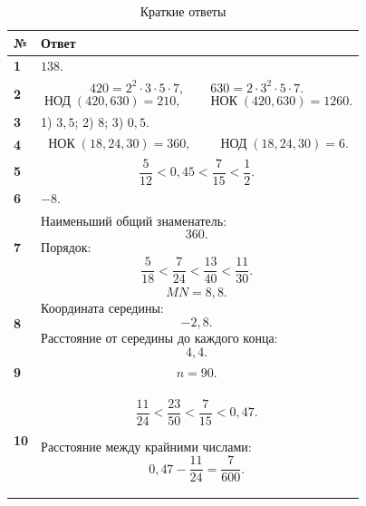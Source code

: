 \documentclass[a4paper,12pt]{article}
\newcommand{\nodmath}{
  \mathop{\mbox{НОД}}\nolimits
}
\newcommand{\nokmath}{
  \mathop{\mbox{НОК}}\nolimits
}
\begin{document}
\begin{table}[ht]
\centering
\caption{Краткие ответы}

\begin{tabularx}{\linewidth}{@{}>{\bfseries}p{12mm}X@{}}

\toprule
№ & Ответ \\
\midrule

1 &
$138$.
\\

2 &
\[
420=2^2\cdot3\cdot5\cdot7,
\qquad
630=2\cdot3^2\cdot5\cdot7.
\]
\[
\nodmath(420,630)=210,
\qquad
\nokmath(420,630)=1260.
\]
\\

3 &
1) $3,5$;
2) $8$;
3) $0,5$.
\\

4 &
\[
\nokmath(18,24,30)=360,
\qquad
\nodmath(18,24,30)=6.
\]
\\

5 &
\[
\frac{5}{12}
<
0,45
<
\frac{7}{15}
<
\frac12.
\]
\\

6 &
$-8$.
\\

7 &
Наименьший общий знаменатель:
\[
360.
\]
Порядок:
\[
\frac{5}{18}
<
\frac{7}{24}
<
\frac{13}{40}
<
\frac{11}{30}.
\]
\\

8 &
\[
MN=8,8.
\]
Координата середины:
\[
-2,8.
\]
Расстояние от середины до каждого конца:
\[
4,4.
\]
\\

9 &
\[
n=90.
\]
\\

10 &
\[
\frac{11}{24}
<
\frac{23}{50}
<
\frac{7}{15}
<
0,47.
\]

Расстояние между крайними числами:
\[
0,47-\frac{11}{24}
=
\frac{7}{600}.
\]
\\

\bottomrule

\end{tabularx}
\end{table}
\end{document}
